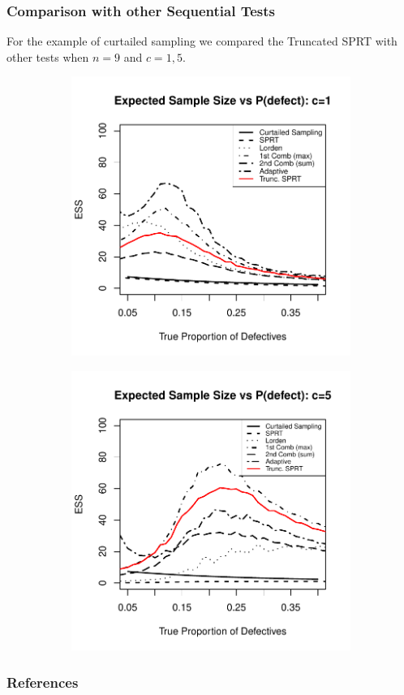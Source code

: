\documentclass[10pt]{beamer}
\begin{document}
\begin{frame}
\frametitle{Comparison with other Sequential Tests}
For the example of curtailed sampling we compared the Truncated SPRT with other tests when $n=9$ and $c=1, 5$.

\begin{figure}
\centering
\begin{subfigure}{0.49\textwidth}
    \includegraphics[width=\textwidth]{images/Curtailed1.pdf}
\end{subfigure}
\hfill
\begin{subfigure}{0.49\textwidth}
    \includegraphics[width=\textwidth]{images/Curtailed2.pdf}
\end{subfigure}
\end{figure}

\end{frame}
\begin{frame}
\frametitle{References}




\end{frame}
\end{document}
